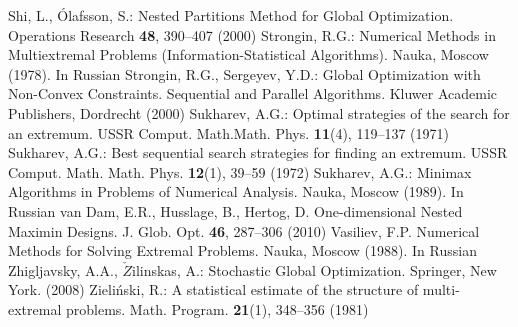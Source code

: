 \begin{thebibliography}{99.}
   Shi, L., {\'O}lafsson, S.: Nested Partitions Method for Global Optimization. Operations Research \textbf{48}, 390--407 (2000)
	Strongin, R.G.: Numerical Methods in Multiextremal Problems (Information-Statistical Algorithms). Nauka, Moscow (1978). In Russian
 Strongin, R.G., Sergeyev, Y.D.: Global Optimization with Non-Convex Constraints. Sequential and Parallel Algorithms. Kluwer Academic Publishers, Dordrecht (2000) 
	Sukharev, A.G.: Optimal strategies of the search for an extremum. USSR Comput. Math.Math. Phys. \textbf{11}(4), 119–137 (1971)
	Sukharev, A.G.: Best sequential search strategies for finding an extremum. USSR Comput. Math. Math. Phys. \textbf{12}(1), 39–59 (1972)
	Sukharev, A.G.: Minimax Algorithms in Problems of Numerical Analysis. Nauka, Moscow (1989). In Russian
	van Dam, E.R., Husslage, B., Hertog, D. One-dimensional Nested Maximin Designs. J. Glob. Opt. \textbf{46}, 287--306 (2010)
	Vasiliev, F.P. Numerical Methods for Solving Extremal Problems. Nauka, Moscow (1988). In Russian
 Zhigljavsky, A.A., $\check{Z}$ilinskas, A.: Stochastic Global Optimization. Springer, New York. (2008)
	Zieli{\'n}ski, R.: A statistical estimate of the structure of multi-extremal problems. Math. Program. \textbf{21}(1), 348--356 (1981)

\end{thebibliography}

%

